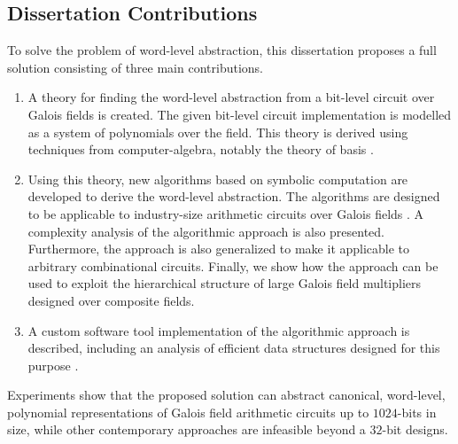 \subsection{Dissertation Contributions}
To solve the problem of word-level abstraction, this dissertation proposes 
a full solution consisting of three main contributions.

\begin{enumerate}
\item A theory for finding the word-level abstraction from a bit-level circuit over Galois fields is created.
The given bit-level circuit implementation is modelled as a system of
polynomials over the field.
This theory is derived using techniques from computer-algebra, notably the theory of
\Grobner basis \cite{pruss:iwls13}.
\item Using this theory, new algorithms based on symbolic computation are developed to 
derive the word-level abstraction. The algorithms are designed to be applicable to 
industry-size arithmetic circuits over Galois fields \cite{pruss:dac14}\cite{sun:date15}.
A complexity analysis of the algorithmic approach is also presented. Furthermore, the
approach is also generalized to make it applicable to arbitrary combinational circuits.
Finally, we show how the approach can be used to exploit the hierarchical structure of
large Galois field multipliers designed over composite fields.
\item A custom software tool implementation of the algorithmic approach is described, including
an analysis of efficient data structures designed for this purpose \cite{pruss:tcad15}.
\end{enumerate}

Experiments show that the proposed solution can abstract canonical, word-level, 
polynomial representations of Galois field arithmetic circuits up to $1024$-bits in
size, while other contemporary approaches are infeasible beyond a $32$-bit designs.



